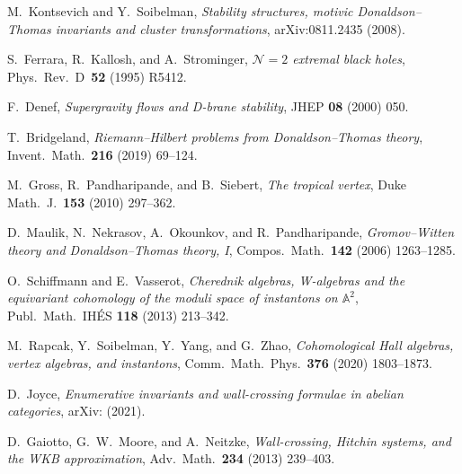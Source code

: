 \documentclass[11pt]{article}
\theoremstyle{definition}
\theoremstyle{remark}
\newcommand{\cN}{\mathcal{N}}
\begin{document}
\begin{enumerate}[label={[\arabic*]}, leftmargin=*, itemsep=2pt]
\item \label{ref:ks08} M.~Kontsevich and Y.~Soibelman,
 \textit{Stability structures, motivic Donaldson--Thomas invariants
 and cluster transformations}, arXiv:0811.2435 (2008).

\item \label{ref:fks95} S.~Ferrara, R.~Kallosh, and A.~Strominger,
 \textit{$\cN = 2$ extremal black holes},
 Phys.\ Rev.\ D~\textbf{52} (1995) R5412.

\item \label{ref:denef00} F.~Denef,
 \textit{Supergravity flows and D-brane stability},
 JHEP \textbf{08} (2000) 050.

\item \label{ref:bridgeland19} T.~Bridgeland,
 \textit{Riemann--Hilbert problems from Donaldson--Thomas theory},
 Invent.\ Math.\ \textbf{216} (2019) 69--124.

\item \label{ref:gps10} M.~Gross, R.~Pandharipande, and B.~Siebert,
 \textit{The tropical vertex},
 Duke Math.\ J.\ \textbf{153} (2010) 297--362.

\item \label{ref:mnop06} D.~Maulik, N.~Nekrasov, A.~Okounkov, and
 R.~Pandharipande,
 \textit{Gromov--Witten theory and Donaldson--Thomas theory, I},
 Compos.\ Math.\ \textbf{142} (2006) 1263--1285.

\item \label{ref:sv13} O.~Schiffmann and E.~Vasserot,
 \textit{Cherednik algebras, W-algebras and the equivariant
 cohomology of the moduli space of instantons on $\mathbb{A}^2$},
 Publ.\ Math.\ IH\'ES \textbf{118} (2013) 213--342.

\item \label{ref:rsyz} M.~Rapcak, Y.~Soibelman, Y.~Yang, and G.~Zhao,
 \textit{Cohomological Hall algebras, vertex algebras, and
 instantons},
 Comm.\ Math.\ Phys.\ \textbf{376} (2020) 1803--1873.

\item \label{ref:joyce21} D.~Joyce,
 \textit{Enumerative invariants and wall-crossing formulae in
 abelian categories},
 arXiv: (2021).

\item \label{ref:gmn10} D.~Gaiotto, G.~W.~Moore, and A.~Neitzke,
 \textit{Wall-crossing, Hitchin systems, and the WKB approximation},
 Adv.\ Math.\ \textbf{234} (2013) 239--403.
\end{enumerate}
\end{document}
